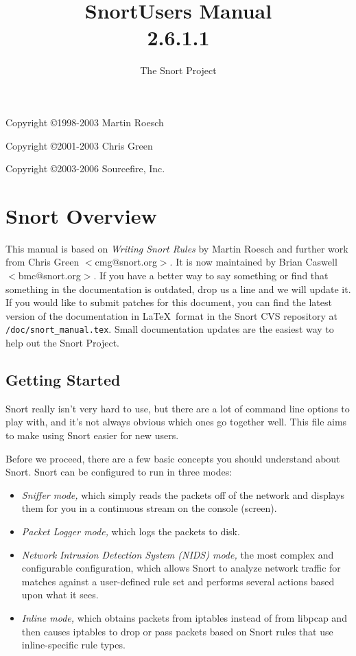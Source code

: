 \documentclass[english]{report}
\begin{document}
\title{Snort\texttrademark  Users Manual\\  2.6.1.1 }

\author{The Snort Project}

\maketitle

\newpage

Copyright \copyright 1998-2003 Martin Roesch

Copyright \copyright 2001-2003 Chris Green

Copyright \copyright 2003-2006 Sourcefire, Inc.

\tableofcontents{}


\chapter{Snort Overview}

This manual is based on \emph{Writing Snort Rules} by Martin Roesch and further
work from Chris Green $<$cmg@snort.org$>$.  It is now maintained by Brian
Caswell $<$bmc@snort.org$>$.  If you have a better way to say something or find
that something in the documentation is outdated, drop us a line and we will
update it.  If you would like to submit patches for this document, you can find
the latest version of the documentation in \LaTeX\ format in the Snort CVS
repository at \verb!/doc/snort_manual.tex!.  Small documentation updates are
the easiest way to help out the Snort Project.

\section{Getting Started}

Snort really isn't very hard to use, but there are a lot of command line
options to play with, and it's not always obvious which ones go together well.
This file aims to make using Snort easier for new users.

Before we proceed, there are a few basic concepts you should understand about
Snort. Snort can be configured to run in three modes:
\begin{itemize}
\item {\em Sniffer mode,} which simply reads the packets off of the network and displays them 
for you in a continuous stream on the console (screen). 
\item {\em Packet Logger mode,} which logs the packets to disk. 
\item {\em Network Intrusion Detection System (NIDS) mode,} the most complex and configurable configuration,
which allows Snort to analyze network traffic for matches against a user-defined
rule set and performs several actions based upon what it sees.
\item {\em Inline mode,} which obtains packets from iptables instead of from libpcap and then
causes iptables to drop or pass packets based on Snort rules that use inline-specific rule types.
\end{itemize}
\end{document}
